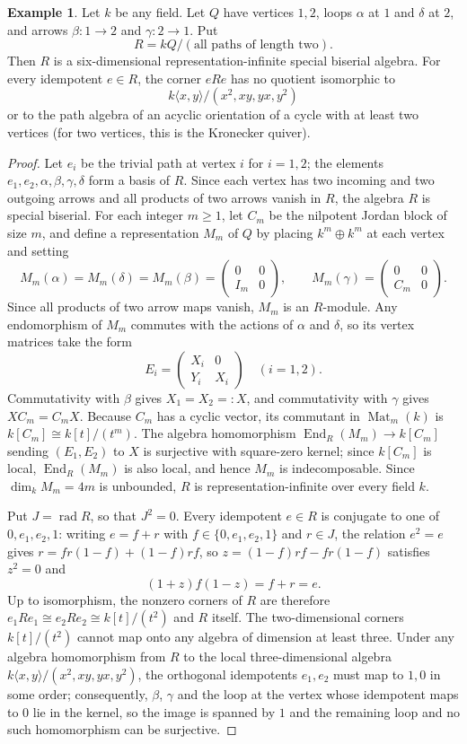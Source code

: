 \documentclass[a4paper,reqno,10pt]{amsart}
\theoremstyle{definition}
\newtheorem{example}[theorem]{Example}
\DeclareMathOperator{\End}{End}
\DeclareMathOperator{\rad}{rad}
\newcommand{\dm}{\dim_k}
\newcommand{\C}{\mathcal C}
\numberwithin{equation}{section}
\begin{document}
\begin{example}\label{ex:simson-corner}
Let $k$ be any field. Let $Q$ have vertices $1,2$, loops
$\alpha$ at $1$ and $\delta$ at $2$, and arrows
$\beta:1\to2$ and $\gamma:2\to1$. Put
\[
 R=kQ/(\text{all paths of length two}).
\]
Then $R$ is a six-dimensional representation-infinite special biserial
algebra. For every idempotent $e\in R$, the corner $eRe$ has no quotient
isomorphic to
\[
 k\langle x,y\rangle/(x^2,xy,yx,y^2)
\]
or to the path algebra of an acyclic orientation of a cycle with at
least two vertices (for two vertices, this is the Kronecker quiver).
\end{example}
\begin{proof}
Let $e_i$ be the trivial path at vertex $i$ for $i=1,2$; the elements $e_1,e_2,\alpha,\beta,\gamma,\delta$ form a basis of $R$.
Since each vertex has two incoming and two outgoing arrows and all products
of two arrows vanish in $R$, the algebra $R$ is special biserial.
For each integer $m\ge1$, let $C_m$ be the nilpotent Jordan block of
size $m$, and define a representation $M_m$ of $Q$ by placing $k^m\oplus k^m$ at each vertex and
setting
\[
 M_m(\alpha)=M_m(\delta)=M_m(\beta)=
 \begin{pmatrix}0&0\\I_m&0\end{pmatrix},
 \qquad
 M_m(\gamma)=\begin{pmatrix}0&0\\C_m&0\end{pmatrix}.
\]
Since all products of two arrow maps vanish, $M_m$ is an $R$-module.
Any endomorphism of $M_m$ commutes with the actions of $\alpha$ and $\delta$, so its vertex matrices take the
form
\[
 E_i=\begin{pmatrix}X_i&0\\Y_i&X_i\end{pmatrix}\quad(i=1,2).
\]
Commutativity with $\beta$ gives $X_1=X_2=:X$, and commutativity with $\gamma$ gives
$XC_m=C_mX$. Because $C_m$ has a cyclic vector, its commutant in $\operatorname{Mat}_m(k)$ is
$k[C_m]\cong k[t]/(t^m)$. The algebra homomorphism
$\End_R(M_m)\to k[C_m]$ sending $(E_1,E_2)$ to $X$ is surjective
with square-zero kernel; since $k[C_m]$ is local, $\End_R(M_m)$ is also
local, and hence $M_m$ is indecomposable. Since $\dm M_m=4m$ is
unbounded, $R$ is representation-infinite over every field $k$.

Put $J=\rad R$, so that $J^2=0$. Every idempotent $e\in R$ is conjugate to one
of $0,e_1,e_2,1$: writing $e=f+r$ with
$f\in\{0,e_1,e_2,1\}$ and $r\in J$, the relation $e^2=e$ gives
$r=fr(1-f)+(1-f)rf$, so $z=(1-f)rf-fr(1-f)$ satisfies $z^2=0$ and
\[
 (1+z)f(1-z)=f+r=e.
\]
Up to isomorphism, the nonzero corners of $R$ are therefore
$e_1Re_1\cong e_2Re_2\cong k[t]/(t^2)$ and $R$ itself. The two-dimensional corners $k[t]/(t^2)$ cannot map onto any algebra of dimension at least three. Under any algebra homomorphism from $R$ to the local three-dimensional
algebra $k\langle x,y\rangle/(x^2,xy,yx,y^2)$, the orthogonal idempotents $e_1,e_2$
must map to $1,0$ in some order; consequently, $\beta$, $\gamma$ and the loop at the
vertex whose idempotent maps to $0$ lie in the kernel, so the image is spanned by $1$
and the remaining loop and no such homomorphism can be surjective.


\end{proof}
\end{document}
